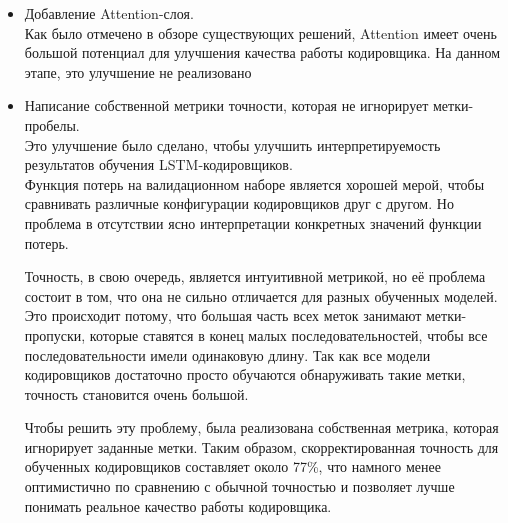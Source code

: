 \begin{itemize}
	\item Добавление Attention-слоя.\\
	Как было отмечено в обзоре существующих решений, Attention имеет очень большой потенциал для улучшения качества работы кодировщика. На данном этапе, это улучшение не реализовано\\
	\item Написание собственной метрики точности, которая не игнорирует метки-пробелы.\\
	Это улучшение было сделано, чтобы улучшить интерпретируемость результатов обучения LSTM-кодировщиков.\\
	Функция потерь на валидационном наборе является хорошей мерой, чтобы сравнивать различные конфигурации кодировщиков друг с другом. Но проблема в отсутствии ясно интерпретации конкретных значений функции потерь.
	
	Точность, в свою очередь, является интуитивной метрикой, но её проблема состоит в том, что она не сильно отличается для разных обученных моделей. Это происходит потому, что большая часть всех меток занимают метки-пропуски, которые ставятся в конец малых последовательностей, чтобы все последовательности имели одинаковую длину. Так как все модели кодировщиков достаточно просто обучаются обнаруживать такие метки, точность становится очень большой.
	
	Чтобы решить эту проблему, была реализована собственная метрика, которая игнорирует заданные метки. Таким образом, скорректированная точность для обученных кодировщиков составляет около 77\%, что намного менее оптимистично по сравнению с обычной точностью и позволяет лучше понимать реальное качество работы кодировщика.
	
\end{itemize}
